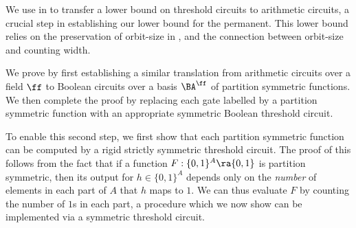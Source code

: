 \documentclass{toc}
\begin{document}
We use  in  to
transfer a lower bound on threshold circuits to arithmetic circuits, a crucial
step in establishing our lower bound for the permanent. This lower bound relies on the preservation of orbit-size in , and the connection between orbit-size and counting width.

We prove  by first establishing a similar
translation from arithmetic circuits over a field $\ff$ to Boolean circuits over
a basis $\BA^{\ff}$ 
of partition symmetric functions. We then complete the proof
by replacing each gate labelled by a partition symmetric function with an
appropriate symmetric Boolean threshold circuit.

To enable this second step, we first show that each partition symmetric function
can be computed by a rigid strictly symmetric threshold circuit. The proof of
this follows from the fact that if a function $F: \{0, 1\}^A \ra \{0, 1\}$ is
partition symmetric, then its output for $h \in \{0, 1\}^A$ depends only on the
\emph{number} of elements in each part of $A$ that $h$ maps to $1$. We can thus
evaluate $F$ by counting the number of $1$s in each part, a procedure which we
now show can be implemented via a symmetric threshold circuit.
\end{document}
